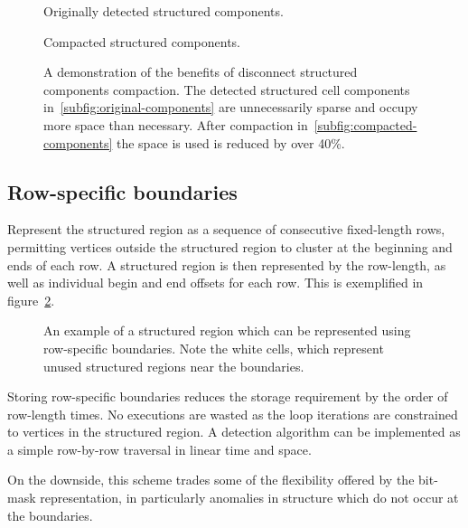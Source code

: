 \begin{figure}

\sidebyside
{
\drawmatrix[cell wd=0.8, cell ht=0.8]{\disjointAmatrix}
\caption{Originally detected structured components.}
\label{subfig:original-components}
}
{
\drawmatrix[cell wd=0.8, cell ht=0.8]{\disjointBmatrix}
\caption{Compacted structured components.}
\label{subfig:compacted-components}
}
\caption{A demonstration of the benefits of disconnect structured components compaction. The detected structured cell components in~\ref{subfig:original-components} are unnecessarily sparse and occupy more space than necessary. After compaction in~\ref{subfig:compacted-components} the space is used is reduced by over 40\%.}
\label{fig:disjoint-matrix}
\end{figure}


\subsection{Row-specific boundaries}

Represent the structured region as a sequence of consecutive fixed-length rows, permitting vertices outside the structured region to cluster at the beginning and ends of each row. A structured region is then represented by the row-length, as well as individual begin and end offsets for each row. This is exemplified in figure~\ref{fig:row-specific}.

\begin{figure}
\drawmatrix[cell wd=0.8, cell ht=0.8]{\bitmapmatrix}
\caption{An example of a structured region which can be represented using row-specific boundaries. Note the white cells, which represent unused structured regions near the boundaries.}
\label{fig:row-specific}
\end{figure}

Storing row-specific boundaries reduces the storage requirement by the order of row-length times.
No executions are wasted as the loop iterations are constrained to vertices in the structured region.
A detection algorithm can be implemented as a simple row-by-row traversal in linear time and space.


On the downside, this scheme trades some of the flexibility offered by the bit-mask representation, in particularly anomalies in structure which do not occur at the boundaries.


